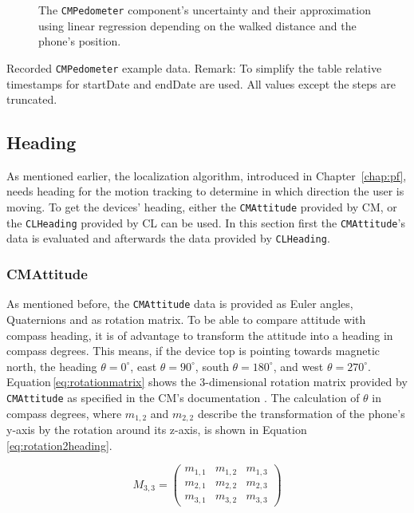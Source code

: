 \begin{figure}
  
  \caption {The \texttt{CMPedometer} component's uncertainty and their approximation using linear regression depending on the walked distance and the phone's position.}
  \label{fig:eval:pedometerNDF}
\end{figure}

\begin{table}
	
	\caption{Recorded \texttt{CMPedometer} example data. Remark: To simplify the table relative timestamps for startDate and endDate are used. All values except the steps are truncated.}
	\label{tab:pedometerEvaluation}
\end{table}


\subsection{Heading}
As mentioned earlier, the localization algorithm, introduced in Chapter~\ref{chap:pf}, needs heading for the motion tracking to determine in which direction the user is moving. To get the devices' heading, either the \texttt{CMAttitude} provided by \ac{CM}, or the \texttt{CLHeading} provided by \ac{CL} can be used. In this section first the \texttt{CMAttitude}'s data is evaluated and afterwards the data provided by \texttt{CLHeading}.

\subsubsection*{CMAttitude}
As mentioned before, the \texttt{CMAttitude} data is provided as Euler angles, Quaternions and as rotation matrix. To be able to compare attitude with compass heading, it is of advantage to transform the attitude into a heading in compass degrees. This means, if the device top is pointing towards magnetic north, the heading $\theta = 0^{\circ}$, east $\theta = 90^{\circ}$, south $\theta = 180^{\circ}$, and west $\theta = 270^{\circ}$. Equation\,\ref{eq:rotationmatrix} shows the 3-dimensional rotation matrix provided by \texttt{CMAttitude} as specified in the \ac{CM}'s documentation \citep{apple:ios_doc_cm}. The calculation of $\theta$ in compass degrees, where $m_{1,2}$ and $m_{2,2}$ describe the transformation of the phone's y-axis by the rotation around its z-axis, is shown in Equation\,\ref{eq:rotation2heading}.

\begin{equation} \label{eq:rotationmatrix}
  M_{3,3} = \begin{pmatrix}
      m_{1,1} & m_{1,2} & m_{1,3} \\
      m_{2,1} & m_{2,2} & m_{2,3} \\
      m_{3,1} & m_{3,2} & m_{3,3}
  \end{pmatrix}
\end{equation}

